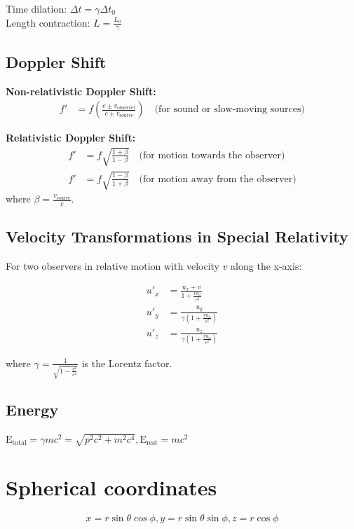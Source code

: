 \documentclass[12pt,a4paper]{article}
\begin{document}
	Time dilation: \( \Delta t = \gamma \Delta t_0\) \\
	
	Length contraction: \( L = \frac{L_0}{\gamma}\) \\
	
	\subsection*{Doppler Shift}
	
	\textbf{Non-relativistic Doppler Shift:}
	\begin{align}
		f' &= f \left( \frac{c \pm v_{\text{observer}}}{c \pm v_{\text{source}}} \right) \quad \text{(for sound or slow-moving sources)}
	\end{align}
	
	\textbf{Relativistic Doppler Shift:}
	\begin{align}
		f' &= f \sqrt{\frac{1 + \beta}{1 - \beta}} \quad \text{(for motion towards the observer)} \\
		f' &= f \sqrt{\frac{1 - \beta}{1 + \beta}} \quad \text{(for motion away from the observer)}
	\end{align}
	where \( \beta = \frac{v_{\text{source}}}{c} \).
	
	\subsection*{Velocity Transformations in Special Relativity}
	
	For two observers in relative motion with velocity \( v \) along the x-axis:
	
	\begin{align}
		u'_{x} &= \frac{u_{x} + v}{1 + \frac{vu_{x}}{c^2}} \\
		u'_{y} &= \frac{u_{y}}{\gamma(1 + \frac{vu_{x}}{c^2})} \\
		u'_{z} &= \frac{u_{z}}{\gamma(1 + \frac{vu_{x}}{c^2})}
	\end{align}
	
	where \( \gamma = \frac{1}{\sqrt{1 - \frac{v^2}{c^2}}} \) is the Lorentz factor.
	
	\subsection*{Energy}
	$\text{E}_\text{total} = \gamma mc^2 = \sqrt{p^2c^2 + m^2c^4}, \text{E}_\text{rest} = mc^2$
	
		
	\section*{Spherical coordinates}
	\[
		x = r \sin \theta \cos \phi,  y = r \sin \theta \sin \phi, z = r \cos \phi
	\]
\end{document}
